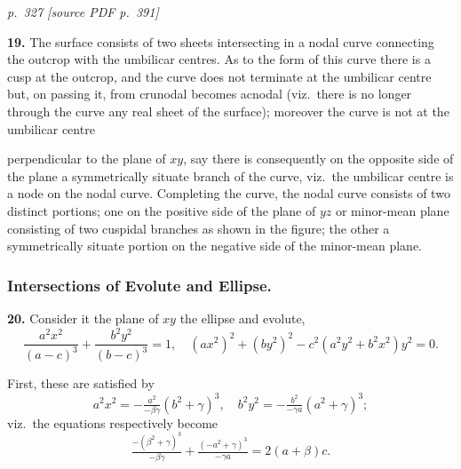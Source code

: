 \documentclass[11pt,a4paper]{article}
\newcommand{\pagemarker}[2]{\par\bigskip\noindent\textit{p.~#1 [source PDF p.~#2]}\par\smallskip}
\begin{document}
\clearpage

\pagemarker{327}{391}

\textbf{19.} The surface consists of two sheets intersecting in a nodal curve connecting the outcrop with the umbilicar centres. As to the form of this curve there is a cusp at the outcrop, and the curve does not terminate at the umbilicar centre but, on passing it, from crunodal becomes acnodal (viz.\ there is no longer through the curve any real sheet of the surface); moreover the curve is not at the umbilicar centre

\begin{center}
\end{center}

perpendicular to the plane of $xy$, say there is consequently on the opposite side of the plane a symmetrically situate branch of the curve, viz.\ the umbilicar centre is a node on the nodal curve. Completing the curve, the nodal curve consists of two distinct portions; one on the positive side of the plane of $yz$ or minor-mean plane consisting of two cuspidal branches as shown in the figure; the other a symmetrically situate portion on the negative side of the minor-mean plane.

\subsubsection*{Intersections of Evolute and Ellipse.}

\textbf{20.} Consider it the plane of $xy$ the ellipse and evolute,
\[
\frac{a^2 x^2}{(a - c)^3} + \frac{b^2 y^2}{(b - c)^3} = 1,\quad (a x^2)^2 + (b y^2)^2 - c^2(a^2 y^2 + b^2 x^2) y^2 = 0.
\]

First, these are satisfied by
\[
a^2 x^2 = -\tfrac{a^2}{-\beta\gamma}(b^2 + \gamma)^3,\quad
b^2 y^2 = -\tfrac{b^2}{-\gamma a}(a^2 + \gamma)^3;
\]
viz.\ the equations respectively become
\[
\tfrac{-(\beta^2 + \gamma)^3}{-\beta\gamma} + \tfrac{(-a^2 + \gamma)^3}{-\gamma a} = 2(a + \beta)c.
\]
\end{document}
